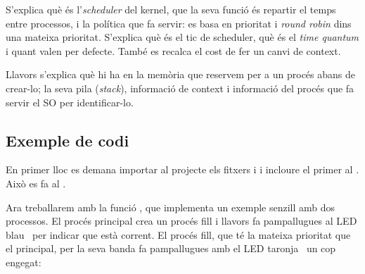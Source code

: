 S'explica què és l'\emph{scheduler} del kernel, que la seva funció és repartir el temps entre
processos, i la política que fa servir: es basa en prioritat i \emph{round robin} dins una
mateixa prioritat. S'explica què és el tic de scheduler, què és el \emph{time quantum} i quant
valen per defecte. També es recalca el cost de fer un canvi de context.

Llavors s'explica què hi ha en la memòria que reservem per a un procés abans de crear-lo;
la seva pila (\emph{stack}), informació de context i informació del procés que fa servir el
SO per identificar-lo.

\subsection{Exemple de codi}

En primer lloc es demana importar al projecte els fitxers  i 
i incloure el primer al . Això es fa al .

Ara treballarem amb la funció , que implementa un exemple senzill amb dos processos.
El procés principal crea un procés fill i llavors fa pampallugues al LED blau~
per indicar que està corrent. El procés fill, que té la mateixa prioritat que el principal,
per la seva banda fa pampallugues amb el LED taronja~ un cop engegat:

